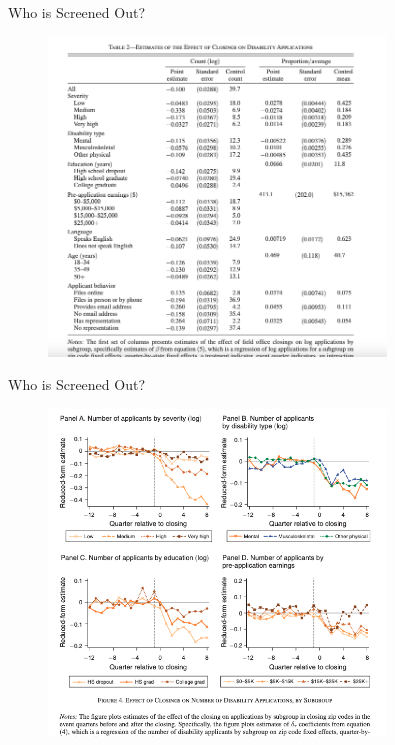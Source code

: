 \documentclass{beamer}
\begin{document}
\begin{frame}{Who is Screened Out?}
    \begin{figure}
        \centering
        \includegraphics[width=0.8\textwidth]{T2.png}
    \end{figure}
\end{frame}

\begin{frame}{Who is Screened Out?}
    \begin{figure}
        \centering
        \includegraphics[width=0.8\textwidth]{F4.png}
    \end{figure}
\end{frame}
\end{document}
